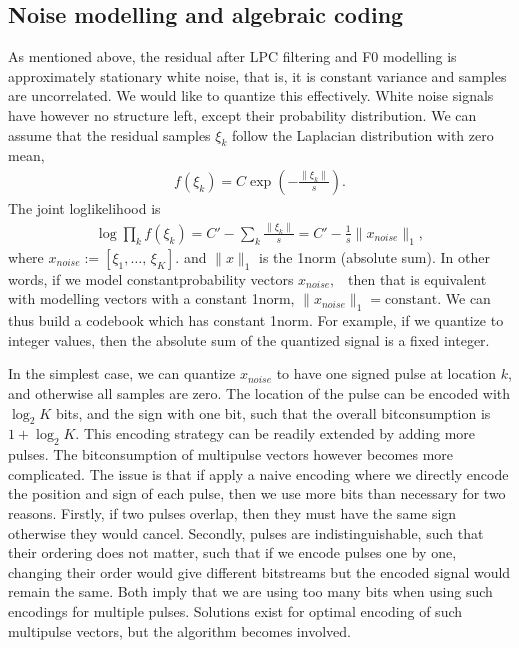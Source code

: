 \documentclass[letterpaper,10pt,english]{jupyterBook}
\begin{document}
\subsection{Noise modelling and algebraic coding}
\label{\detokenize{Transmission/Code-excited_linear_prediction_CELP:noise-modelling-and-algebraic-coding}}
\sphinxAtStartPar
As mentioned above, the residual after LPC filtering and F0 modelling is
approximately stationary white noise, that is, it is constant variance
and samples are uncorrelated. We would like to quantize this
effectively. White noise signals have however no structure left, except
their probability distribution. We can assume that the residual samples
\( \xi_k \) follow the Laplacian distribution with zero mean,
\begin{equation*}
\begin{split} f(\xi_k)= C \exp\left(-\frac{\|\xi_k\|}{s}\right). \end{split}
\end{equation*}
\sphinxAtStartPar
The joint log\sphinxhyphen{}likelihood is
\begin{equation*}
\begin{split} \log\prod_k f(\xi_k)= C'- \sum_k\frac{\|\xi_k\|}{s} = C' -
\frac1s \|x_{noise}\|_1, \end{split}
\end{equation*}
\sphinxAtStartPar
where \( x_{noise}:= [\xi_1,\dotsc,\,\xi_{K}]. \) and \(
\|x\|_1 \) is the 1\sphinxhyphen{}norm (absolute sum). In other words, if we
model constant\sphinxhyphen{}probability vectors \( x_{noise}, \)  then that is
equivalent with modelling vectors with a constant 1\sphinxhyphen{}norm, \(
\|x_{noise}\|_1=\text{constant}. \) We can thus build a codebook
which has constant 1\sphinxhyphen{}norm. For example, if we quantize to integer
values, then the absolute sum of the quantized signal is a fixed
integer.

\sphinxAtStartPar
In the simplest case, we can quantize \( x_{noise} \) to have one
signed pulse at location \(k\), and otherwise all samples are zero. The
location of the pulse can be encoded with \( \log_2 K \) bits, and
the sign with one bit, such that the overall bit\sphinxhyphen{}consumption is \(
1+\log_2 K. \) This encoding strategy can be readily extended by
adding more pulses. The bit\sphinxhyphen{}consumption of multi\sphinxhyphen{}pulse vectors however
becomes more complicated. The issue is that if apply a naive encoding
where we directly encode the position and sign of each pulse, then we
use more bits than necessary for two reasons. Firstly, if two pulses
overlap, then they must have the same sign otherwise they would cancel.
Secondly, pulses are indistinguishable, such that their ordering does
not matter, such that if we encode pulses one by one, changing their
order would give different bit\sphinxhyphen{}streams but the encoded signal would
remain the same. Both imply that we are using too many bits when using
such encodings for multiple pulses. Solutions exist for optimal encoding
of such multi\sphinxhyphen{}pulse vectors, but the algorithm becomes involved.
\end{document}
